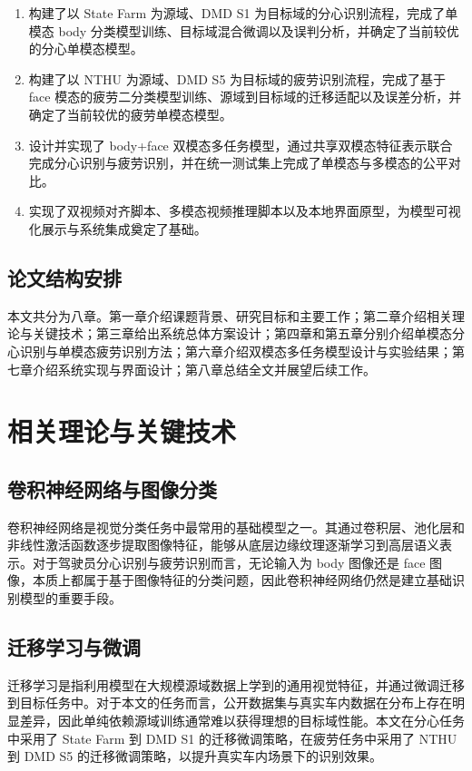 \documentclass[12pt]{ctexrep}
\begin{document}
\begin{enumerate}
    \item 构建了以 State Farm 为源域、DMD S1 为目标域的分心识别流程，完成了单模态 body 分类模型训练、目标域混合微调以及误判分析，并确定了当前较优的分心单模态模型。
    \item 构建了以 NTHU 为源域、DMD S5 为目标域的疲劳识别流程，完成了基于 face 模态的疲劳二分类模型训练、源域到目标域的迁移适配以及误差分析，并确定了当前较优的疲劳单模态模型。
    \item 设计并实现了 body+face 双模态多任务模型，通过共享双模态特征表示联合完成分心识别与疲劳识别，并在统一测试集上完成了单模态与多模态的公平对比。
    \item 实现了双视频对齐脚本、多模态视频推理脚本以及本地界面原型，为模型可视化展示与系统集成奠定了基础。
\end{enumerate}

\section{论文结构安排}
本文共分为八章。第一章介绍课题背景、研究目标和主要工作；第二章介绍相关理论与关键技术；第三章给出系统总体方案设计；第四章和第五章分别介绍单模态分心识别与单模态疲劳识别方法；第六章介绍双模态多任务模型设计与实验结果；第七章介绍系统实现与界面设计；第八章总结全文并展望后续工作。

\chapter{相关理论与关键技术}

\section{卷积神经网络与图像分类}
卷积神经网络是视觉分类任务中最常用的基础模型之一。其通过卷积层、池化层和非线性激活函数逐步提取图像特征，能够从底层边缘纹理逐渐学习到高层语义表示。对于驾驶员分心识别与疲劳识别而言，无论输入为 body 图像还是 face 图像，本质上都属于基于图像特征的分类问题，因此卷积神经网络仍然是建立基础识别模型的重要手段。

\section{迁移学习与微调}
迁移学习是指利用模型在大规模源域数据上学到的通用视觉特征，并通过微调迁移到目标任务中。对于本文的任务而言，公开数据集与真实车内数据在分布上存在明显差异，因此单纯依赖源域训练通常难以获得理想的目标域性能。本文在分心任务中采用了 State Farm 到 DMD S1 的迁移微调策略，在疲劳任务中采用了 NTHU 到 DMD S5 的迁移微调策略，以提升真实车内场景下的识别效果。
\end{document}
